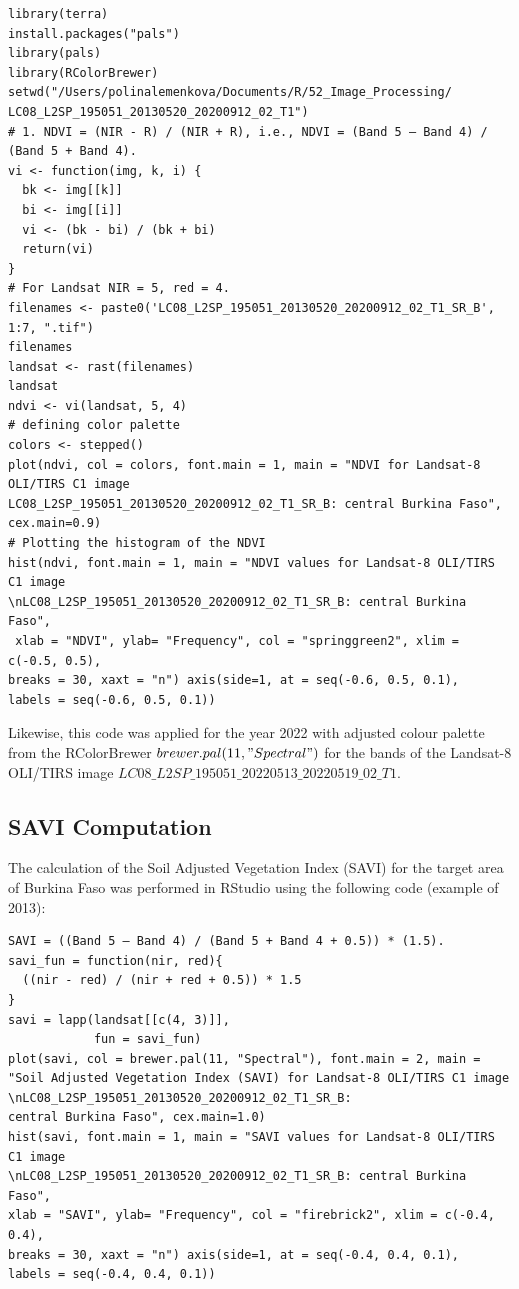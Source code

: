 \documentclass[knowledge,article,submit,pdftex,moreauthors]{Definitions/mdpi}
\begin{document}
\begin{small}
\begin{verbatim}
library(terra)
install.packages("pals")
library(pals)
library(RColorBrewer)
setwd("/Users/polinalemenkova/Documents/R/52_Image_Processing/
LC08_L2SP_195051_20130520_20200912_02_T1")
# 1. NDVI = (NIR - R) / (NIR + R), i.e., NDVI = (Band 5 – Band 4) / (Band 5 + Band 4).
vi <- function(img, k, i) {
  bk <- img[[k]]
  bi <- img[[i]]
  vi <- (bk - bi) / (bk + bi)
  return(vi)
}
# For Landsat NIR = 5, red = 4.
filenames <- paste0('LC08_L2SP_195051_20130520_20200912_02_T1_SR_B', 1:7, ".tif")
filenames
landsat <- rast(filenames)
landsat
ndvi <- vi(landsat, 5, 4)
# defining color palette
colors <- stepped()
plot(ndvi, col = colors, font.main = 1, main = "NDVI for Landsat-8 OLI/TIRS C1 image 
LC08_L2SP_195051_20130520_20200912_02_T1_SR_B: central Burkina Faso", cex.main=0.9)
# Plotting the histogram of the NDVI
hist(ndvi, font.main = 1, main = "NDVI values for Landsat-8 OLI/TIRS C1 image
\nLC08_L2SP_195051_20130520_20200912_02_T1_SR_B: central Burkina Faso", 
 xlab = "NDVI", ylab= "Frequency", col = "springgreen2", xlim = c(-0.5, 0.5), 
breaks = 30, xaxt = "n") axis(side=1, at = seq(-0.6, 0.5, 0.1), 
labels = seq(-0.6, 0.5, 0.1))
\end{verbatim} 
\end{small}

Likewise, this code was applied for the year 2022 with adjusted colour palette from the RColorBrewer $brewer.pal(11, "Spectral")$ for the bands of the Landsat-8 OLI/TIRS image $LC08\_L2SP\_195051\_20220513\_20220519\_02\_T1$.

 \subsection{SAVI Computation}
The calculation of the Soil Adjusted Vegetation Index (SAVI) for the target area of Burkina Faso was performed in RStudio using the following code (example of 2013): 

\begin{small}
\begin{verbatim}
SAVI = ((Band 5 – Band 4) / (Band 5 + Band 4 + 0.5)) * (1.5).
savi_fun = function(nir, red){
  ((nir - red) / (nir + red + 0.5)) * 1.5
}
savi = lapp(landsat[[c(4, 3)]],
            fun = savi_fun)
plot(savi, col = brewer.pal(11, "Spectral"), font.main = 2, main = 
"Soil Adjusted Vegetation Index (SAVI) for Landsat-8 OLI/TIRS C1 image 
\nLC08_L2SP_195051_20130520_20200912_02_T1_SR_B: 
central Burkina Faso", cex.main=1.0)
hist(savi, font.main = 1, main = "SAVI values for Landsat-8 OLI/TIRS C1 image 
\nLC08_L2SP_195051_20130520_20200912_02_T1_SR_B: central Burkina Faso", 
xlab = "SAVI", ylab= "Frequency", col = "firebrick2", xlim = c(-0.4, 0.4),  
breaks = 30, xaxt = "n") axis(side=1, at = seq(-0.4, 0.4, 0.1), 
labels = seq(-0.4, 0.4, 0.1))
\end{verbatim} 
\end{small}
\end{document}
